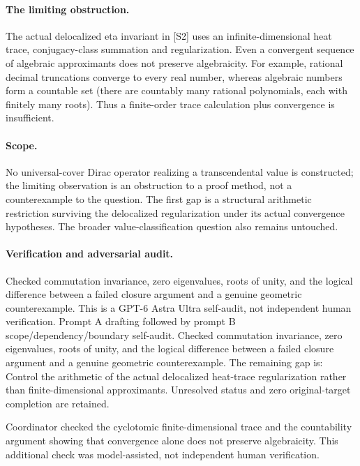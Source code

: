 \documentclass[11pt]{article}
\begin{document}
\paragraph{The limiting obstruction.} The actual delocalized eta invariant in [S2] uses an infinite-dimensional heat trace, conjugacy-class summation and regularization. Even a convergent sequence of algebraic approximants does not preserve algebraicity. For example, rational decimal truncations converge to every real number, whereas algebraic numbers form a countable set (there are countably many rational polynomials, each with finitely many roots). Thus a finite-order trace calculation plus convergence is insufficient.
\paragraph{Scope.} No universal-cover Dirac operator realizing a transcendental value is constructed; the limiting observation is an obstruction to a proof method, not a counterexample to the question. The first gap is a structural arithmetic restriction surviving the delocalized regularization under its actual convergence hypotheses. The broader value-classification question also remains untouched.

\paragraph{Verification and adversarial audit.}
Checked commutation invariance, zero eigenvalues, roots of unity, and the logical difference between a failed closure argument and a genuine geometric counterexample. This is a GPT-6 Astra Ultra self-audit, not independent human verification. Prompt A drafting followed by prompt B scope/dependency/boundary self-audit. Checked commutation invariance, zero eigenvalues, roots of unity, and the logical difference between a failed closure argument and a genuine geometric counterexample. The remaining gap is: Control the arithmetic of the actual delocalized heat-trace regularization rather than finite-dimensional approximants. Unresolved status and zero original-target completion are retained.

Coordinator checked the cyclotomic finite-dimensional trace and the countability argument showing that convergence alone does not preserve algebraicity. This additional check was model-assisted, not independent human verification.
\end{document}
